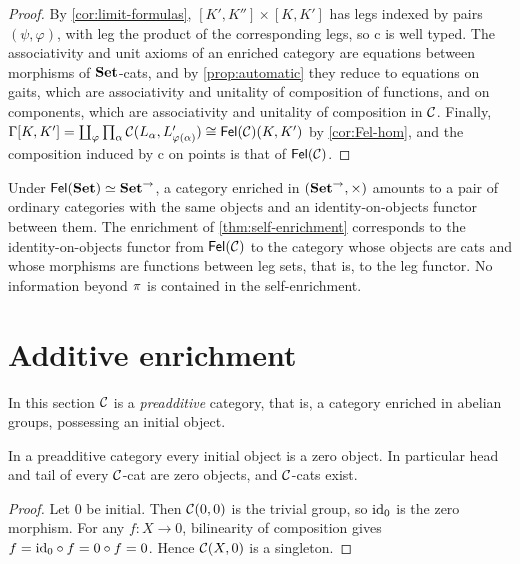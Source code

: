 \begin{proof}
By \cref{cor:limit-formulas}, $[K',K'']\times[K,K']$ has legs indexed by pairs
$(\psi,\varphi)$, with leg the product of the corresponding legs, so
$\mathrm c$ is well typed. The associativity and unit axioms of an enriched
category are equations between morphisms of $\mathbf{Set}$-cats, and by
\cref{prop:automatic} they reduce to equations on gaits, which are
associativity and unitality of composition of functions, and on components,
which are associativity and unitality of composition in $\mathcal{C}$. Finally,
$\Gamma[K,K']=\coprod_\varphi\prod_\alpha\mathcal{C}(L_\alpha,L'_{\varphi(\alpha)})\cong\mathsf{Fel}(\mathcal{C})(K,K')$
by \cref{cor:Fel-hom}, and the composition induced by $\mathrm c$ on points is
that of $\mathsf{Fel}(\mathcal{C})$.
\end{proof}

\begin{remark}\label{rem:self-enrichment-honest}
Under $\mathsf{Fel}(\mathbf{Set})\simeq\mathbf{Set}^{\to}$, a category enriched in $(\mathbf{Set}^{\to},\times)$
amounts to a pair of ordinary categories with the same objects and an
identity-on-objects functor between them. The enrichment of
\cref{thm:self-enrichment} corresponds to the identity-on-objects functor from
$\mathsf{Fel}(\mathcal{C})$ to the category whose objects are cats and whose morphisms are
functions between leg sets, that is, to the leg functor. No information beyond
$\pi$ is contained in the self-enrichment.
\end{remark}

\section{Additive enrichment}\label{sec:additive}

In this section $\mathcal{C}$ is a \emph{preadditive} category, that is, a category
enriched in abelian groups, possessing an initial object.

\begin{lemma}\label{lem:Ab-zero}
In a preadditive category every initial object is a zero object. In
particular head and tail of every $\mathcal{C}$-cat are zero objects, and $\mathcal{C}$-cats
exist.
\end{lemma}

\begin{proof}
Let $0$ be initial. Then $\mathcal{C}(0,0)$ is the trivial group, so $\mathrm{id}_0$ is the zero
morphism. For any $f\colon X\to0$, bilinearity of composition gives
$f=\mathrm{id}_0\circ f=0\circ f=0$. Hence $\mathcal{C}(X,0)$ is a singleton.
\end{proof}

